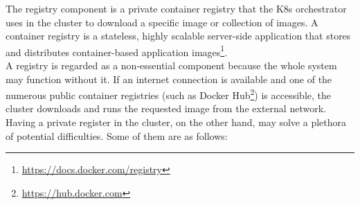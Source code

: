 The registry component is a private container registry that the K8s orchestrator
uses in the cluster to download a specific image or collection of images. A container
registry is a stateless, highly scalable server-side application that stores and
distributes container-based application images\footnote{\url{https://docs.docker.com/registry}}.
\\ %
A registry is regarded as a non-essential component because the whole system may
function without it. If an internet connection is available and one of the numerous
public container registries (such as Docker Hub\footnote{\url{https://hub.docker.com}})
is accessible, the cluster downloads and runs the requested image from the
external network. Having a private register in the cluster, on the other hand, may
solve a plethora of potential difficulties. Some of them are as follows:

